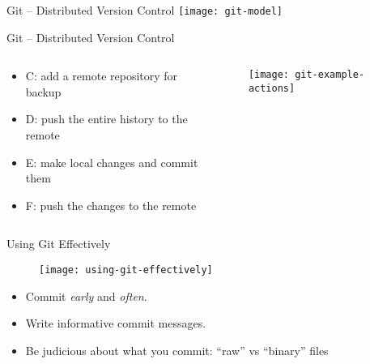 \documentclass{beamer}
\begin{document}
\begin{frame}{Git -- Distributed Version Control}
  \center
  \texttt{[image: git-model]}
\end{frame}

\begin{frame}{Git -- Distributed Version Control}
  \begin{columns}
    \begin{column}{0.5\textwidth}
      \begin{itemize}
        \item C: add a remote repository for backup
        \item D: push the entire history to the remote
        \item E: make local changes and commit them
        \item F: push the changes to the remote
      \end{itemize}
    \end{column}

    \begin{column}{0.5\textwidth}
      \begin{figure}
        \center
        \texttt{[image: git-example-actions]}
      \end{figure}
    \end{column}
  \end{columns}
\end{frame}

\begin{frame}{Using Git Effectively}
  \begin{figure}
    \center
    \texttt{[image: using-git-effectively]}
  \end{figure}

  \begin{itemize}
    \item Commit \textit{early} and \textit{often}.

    \item Write informative commit messages.

    \item Be judicious about what you commit: ``raw'' vs ``binary'' files
  \end{itemize}
\end{frame}
\end{document}
